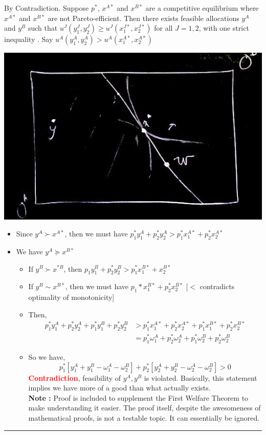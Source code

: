 \documentclass[twoside]{article}
\newenvironment{proof}{{\bf Proof:}}{\hfill\rule{2mm}{2mm}}
\begin{document}
\begin{proof} By Contradiction. Suppose \(p^*\), \(x^{A*}\) and \(x^{B*}\) are a competitive equilibrium where \(x^{A*}\) and \(x^{B*}\) are not Pareto-efficient. Then there exists feasible allocations \(y^A\) and \(y^B\) such that \(u^J(y_1^J, y_2^J) \geq u^J(x_1^{J*}, x_2^{J*})\) for all \(J = 1, 2\), with one strict inequality . Say \(u^A(y_1^A, y_2^A) > u^A(x_1^{A*}, x_2^{A*})\)\\
\begin{center}
\includegraphics[scale=0.4]{26}
\end{center}
\begin{itemize}
\item Since \(y^A \succ x^{A*}\), then we must have \(p_1^* y_1^A + p_2^* y_2^A > p_1^* x_1^{A*} + p_2^* x_2^{A*}\)
\item We have \(y^A \succeq x^{B*}\)
\begin{itemize}
\item If \(y^B \succ x^{*B}\), then \(p_1 y_1^B + p_2^* y_2^B > p_1^* x_1^{B*} + x_2^{B*}\)
\item If \(y^B \sim x^{B*}\), then we must have \(p_1* x_1^{B*} + p_2^* x_2^{B*}\) [\(<\) contradicts optimality of monotonicity]
\item Then, \[\begin{aligned}p_1^* y_1^A + p_2^* y_2^A + p_1^* y_1^B  + p_2^* y_2^B & > p_1^* x_1^{A*} + p_2^* x_2^{A*} + p_1^* x_1^{B*} + p_2^* x_2^{B*} \\ & =  p_1^* \omega^A_1 + p_2^* \omega_2^A + p_1^*  \omega_2^B + p_2^* \omega_2^B \end{aligned}\]
\item So we have, \[p_1^* [y_1^A + y_1^B - \omega_1^A - \omega^B_2] + p_2^* [y^A_2 + y_2^B - \omega_2^A - \omega_2^B] > 0\]
\textbf{\textcolor{red}{Contradiction}}, feasibility of \(y^A, y^B\) is violated. Basically, this statement implies we have more of a good than what actually exists. \\

\textbf{Note : } Proof is included to supplement the First Welfare Theorem to make understanding it easier. The proof itself, despite the awesomeness of mathematical proofs,  is not a testable topic. It can essentially be ignored.
\end{itemize}
\end{itemize}
\end{proof}
\end{document}
